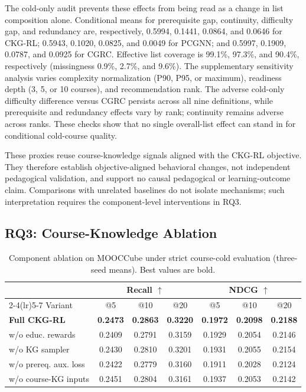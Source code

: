\documentclass[letterpaper]{article}
\begin{document}
The cold-only audit prevents these effects from being read as a change in list composition alone. Conditional means for prerequisite gap, continuity, difficulty gap, and redundancy are, respectively, 0.5994, 0.1441, 0.0864, and 0.0646 for CKG-RL; 0.5943, 0.1020, 0.0825, and 0.0049 for PCGNN; and 0.5997, 0.1909, 0.0787, and 0.0925 for CGRC. Effective list coverage is 99.1\%, 97.3\%, and 90.4\%, respectively (missingness 0.9\%, 2.7\%, and 9.6\%). The supplementary sensitivity analysis varies complexity normalization (P90, P95, or maximum), readiness depth (3, 5, or 10 courses), and recommendation rank. The adverse cold-only difficulty difference versus CGRC persists across all nine definitions, while prerequisite and redundancy effects vary by rank; continuity remains adverse across ranks. These checks show that no single overall-list effect can stand in for conditional cold-course quality.

These proxies reuse course-knowledge signals aligned with the CKG-RL objective. They therefore establish objective-aligned behavioral changes, not independent pedagogical validation, and support no causal pedagogical or learning-outcome claim. Comparisons with unrelated baselines do not isolate mechanisms; such interpretation requires the component-level interventions in RQ3.

\subsection{RQ3: Course-Knowledge Ablation}
\begin{table}[!t]
\centering
{
\footnotesize
\setlength{\tabcolsep}{5.5pt}
\begin{tabular*}{\textwidth}{@{\extracolsep{\fill}}lcccccc}
\toprule
& \multicolumn{3}{c}{Recall \(\uparrow\)} & \multicolumn{3}{c}{NDCG \(\uparrow\)} \\
\cmidrule(lr){2-4}\cmidrule(lr){5-7}
Variant & @5 & @10 & @20 & @5 & @10 & @20 \\
\midrule
\textbf{Full CKG-RL} & \textbf{0.2473} & \textbf{0.2863} & \textbf{0.3220} & \textbf{0.1972} & \textbf{0.2098} & \textbf{0.2188} \\
w/o educ. rewards & 0.2409 & 0.2791 & 0.3159 & 0.1929 & 0.2054 & 0.2146 \\
w/o KG sampler & 0.2430 & 0.2810 & 0.3201 & 0.1931 & 0.2055 & 0.2154 \\
w/o prereq. aux. loss & 0.2422 & 0.2779 & 0.3160 & 0.1911 & 0.2028 & 0.2124 \\
w/o course-KG inputs & 0.2451 & 0.2804 & 0.3161 & 0.1937 & 0.2053 & 0.2142 \\
\bottomrule
\end{tabular*}
}
\caption{Component ablation on MOOCCube under strict course-cold evaluation (three-seed means). Best values are bold.}
\label{tab:core-ablation}
\end{table}
\end{document}
